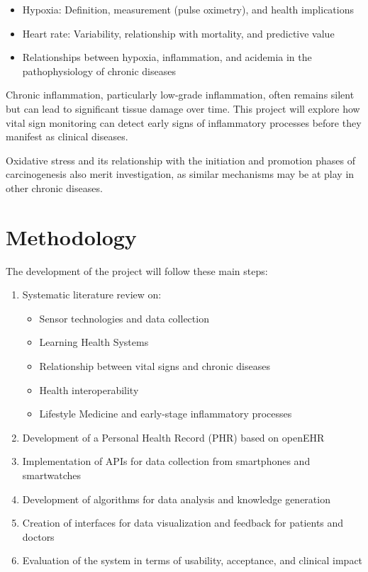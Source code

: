 \begin{itemize}
\item Hypoxia: Definition, measurement (pulse oximetry), and health implications
\item Heart rate: Variability, relationship with mortality, and predictive value
\item Relationships between hypoxia, inflammation, and acidemia in the pathophysiology of chronic diseases
\end{itemize}

Chronic inflammation, particularly low-grade inflammation, often remains silent but can lead to significant tissue damage over time. This project will explore how vital sign monitoring can detect early signs of inflammatory processes before they manifest as clinical diseases.

Oxidative stress and its relationship with the initiation and promotion phases of carcinogenesis also merit investigation, as similar mechanisms may be at play in other chronic diseases.

\section{Methodology} \label{sec:methodology}

The development of the project will follow these main steps:

\begin{enumerate}
\item Systematic literature review on:
   \begin{itemize}
   \item Sensor technologies and data collection
   \item Learning Health Systems
   \item Relationship between vital signs and chronic diseases
   \item Health interoperability
   \item Lifestyle Medicine and early-stage inflammatory processes
   \end{itemize}
\item Development of a Personal Health Record (PHR) based on openEHR
\item Implementation of APIs for data collection from smartphones and smartwatches
\item Development of algorithms for data analysis and knowledge generation
\item Creation of interfaces for data visualization and feedback for patients and doctors
\item Evaluation of the system in terms of usability, acceptance, and clinical impact
\end{enumerate}

